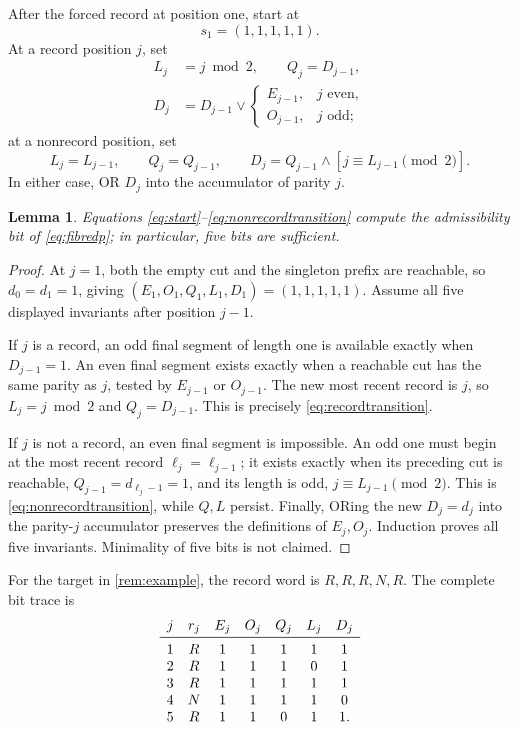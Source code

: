 \documentclass[10pt,a4paper]{amsart}
\newtheorem{lemma}[theorem]{Lemma}
\theoremstyle{definition}
\theoremstyle{remark}
\begin{document}
After the forced record at position one, start at
\[
                         s_1=(1,1,1,1,1).                  \tag{4.2}\label{eq:start}
\]
At a record position \(j\), set
\[
\begin{split}
 L_j&=j\bmod2,\qquad Q_j=D_{j-1},\\
 D_j&=D_{j-1}\vee
 \begin{cases}E_{j-1},&j\text{ even},\\O_{j-1},&j\text{ odd};\end{cases}
\end{split}                                                \tag{4.3}\label{eq:recordtransition}
\]
at a nonrecord position, set
\[
 L_j=L_{j-1},\qquad Q_j=Q_{j-1},\qquad
 D_j=Q_{j-1}\wedge[j\equiv L_{j-1}\pmod2].                \tag{4.4}\label{eq:nonrecordtransition}
\]
In either case, OR \(D_j\) into the accumulator of parity \(j\).

\begin{lemma}\label{lem:state}
Equations \eqref{eq:start}--\eqref{eq:nonrecordtransition} compute the admissibility bit of
\eqref{eq:fibredp}; in particular, five bits are sufficient.
\end{lemma}

\begin{proof}
At \(j=1\), both the empty cut and the singleton prefix are reachable, so
\(d_0=d_1=1\), giving \((E_1,O_1,Q_1,L_1,D_1)=(1,1,1,1,1)\).
Assume all five displayed invariants after position \(j-1\).

If \(j\) is a record, an odd final segment of length one is available exactly
when \(D_{j-1}=1\).  An even final segment exists exactly when a reachable cut
has the same parity as \(j\), tested by \(E_{j-1}\) or \(O_{j-1}\).  The new
most recent record is \(j\), so \(L_j=j\bmod2\) and \(Q_j=D_{j-1}\).  This is
precisely \eqref{eq:recordtransition}.

If \(j\) is not a record, an even final segment is impossible.  An odd one
must begin at the most recent record \(\ell_j=\ell_{j-1}\); it exists exactly
when its preceding cut is reachable, \(Q_{j-1}=d_{\ell_j-1}=1\), and its
length is odd, \(j\equiv L_{j-1}\pmod2\).  This is
\eqref{eq:nonrecordtransition}, while \(Q,L\) persist.  Finally, ORing the new
\(D_j=d_j\) into the parity-\(j\) accumulator preserves the definitions of
\(E_j,O_j\).  Induction proves all five invariants.  Minimality of five bits
is not claimed.
\end{proof}

For the target in \cref{rem:example}, the record word is
\(R,R,R,N,R\).  The complete bit trace is
\[
\begin{array}{c@{\quad}c@{\quad}ccccc}
j&r_j&E_j&O_j&Q_j&L_j&D_j\\ \midrule
1&R&1&1&1&1&1\\
2&R&1&1&1&0&1\\
3&R&1&1&1&1&1\\
4&N&1&1&1&1&0\\
5&R&1&1&0&1&1.
\end{array}
\]
\end{document}
